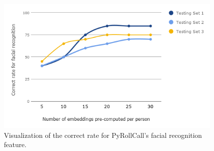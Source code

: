 \begin{figure}[!htb]
  \centering
  \includegraphics[width=0.85\linewidth]{figures/exp-result-chart.png}
  \caption{Visualization of the correct rate for PyRollCall's facial recognition feature.}
  \label{fig:exp-result-chart}
\end{figure}
